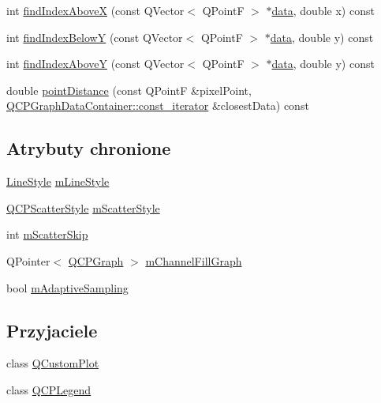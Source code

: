 \begin{DoxyCompactItemize}
int \hyperlink{class_q_c_p_graph_abab2a75b5e63630432bdd1f3b57f07fa}{find\+Index\+AboveX} (const Q\+Vector$<$ Q\+PointF $>$ $\ast$\hyperlink{class_q_c_p_graph_a04514a2b1fb61a280ead66abe80b89ab}{data}, double x) const 
\item 
int \hyperlink{class_q_c_p_graph_a6c4d556de3d1e02f548401001f72c6ff}{find\+Index\+BelowY} (const Q\+Vector$<$ Q\+PointF $>$ $\ast$\hyperlink{class_q_c_p_graph_a04514a2b1fb61a280ead66abe80b89ab}{data}, double y) const 
\item 
int \hyperlink{class_q_c_p_graph_adf50243f1df203883a2187089734bfcb}{find\+Index\+AboveY} (const Q\+Vector$<$ Q\+PointF $>$ $\ast$\hyperlink{class_q_c_p_graph_a04514a2b1fb61a280ead66abe80b89ab}{data}, double y) const 
\item 
double \hyperlink{class_q_c_p_graph_a619f22c55dffe9e6f380c5c79e3d9f0f}{point\+Distance} (const Q\+PointF \&pixel\+Point, \hyperlink{class_q_c_p_data_container_ae40a91f5cb0bcac61d727427449b7d15}{Q\+C\+P\+Graph\+Data\+Container\+::const\+\_\+iterator} \&closest\+Data) const 
\end{DoxyCompactItemize}
\subsection*{Atrybuty chronione}
\begin{DoxyCompactItemize}
\item 
\hyperlink{class_q_c_p_graph_ad60175cd9b5cac937c5ee685c32c0859}{Line\+Style} \hyperlink{class_q_c_p_graph_a8604fd98402035a63375849f7341ee25}{m\+Line\+Style}
\item 
\hyperlink{class_q_c_p_scatter_style}{Q\+C\+P\+Scatter\+Style} \hyperlink{class_q_c_p_graph_a4aa36241f166ccd1f75fc8f24e4a3247}{m\+Scatter\+Style}
\item 
int \hyperlink{class_q_c_p_graph_a4ca1e50fbfe8307022b42a6f6178fae0}{m\+Scatter\+Skip}
\item 
Q\+Pointer$<$ \hyperlink{class_q_c_p_graph}{Q\+C\+P\+Graph} $>$ \hyperlink{class_q_c_p_graph_a2f1777c7accf8244fc640c33f0b04577}{m\+Channel\+Fill\+Graph}
\item 
bool \hyperlink{class_q_c_p_graph_aa951e78aeba714cf443be6da2e52502e}{m\+Adaptive\+Sampling}
\end{DoxyCompactItemize}
\subsection*{Przyjaciele}
\begin{DoxyCompactItemize}
\item 
class \hyperlink{class_q_c_p_graph_a1cdf9df76adcfae45261690aa0ca2198}{Q\+Custom\+Plot}
\item 
class \hyperlink{class_q_c_p_graph_a8429035e7adfbd7f05805a6530ad5e3b}{Q\+C\+P\+Legend}
\end{DoxyCompactItemize}
